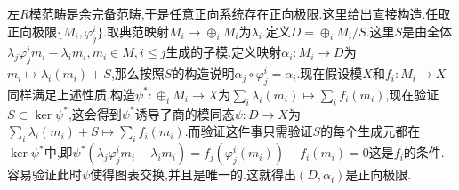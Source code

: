\begin{enumerate}
	左$R$模范畴是余完备范畴,于是任意正向系统存在正向极限.这里给出直接构造.任取正向极限$\{M_i,\varphi_j^i\}$.取典范映射$M_i\to\oplus_iM_i$为$\lambda_i$.定义$D=\oplus_iM_i/S$.这里$S$是由全体$\lambda_j\varphi_j^im_i-\lambda_im_i,m_i\in M,i\le j$生成的子模.定义映射$\alpha_i:M_i\to D$为$m_i\mapsto\lambda_i(m_i)+S$,那么按照$S$的构造说明$\alpha_j\circ\varphi_j^i=\alpha_i$.现在假设模$X$和$f_i:M_i\to X$同样满足上述性质,构造$\psi^*:\oplus_iM_i\to X$为$\sum_i\lambda_i(m_i)\mapsto\sum_if_i(m_i)$,现在验证$S\subset\ker\psi^*$,这会得到$\psi^*$诱导了商的模同态$\psi:D\to X$为$\sum_i\lambda_i(m_i)+S\mapsto\sum_if_i(m_i)$.而验证这件事只需验证$S$的每个生成元都在$\ker\psi^*$中,即$\psi^*(\lambda_j\varphi_j^im_i-\lambda_im_i)=f_j(\varphi_j^i(m_i))-f_i(m_i)=0$这是$f_i$的条件.容易验证此时$\psi$使得图表交换,并且是唯一的.这就得出$(D,\alpha_i)$是正向极限.
\end{enumerate}


